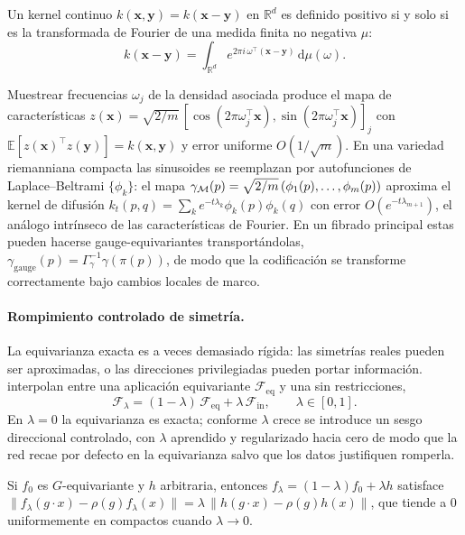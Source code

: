 \begin{theorem}[Bochner]
\label{thm:gauge:bochner}
Un kernel continuo $k(\mathbf{x}, \mathbf{y}) = k(\mathbf{x} - \mathbf{y})$ en
$\mathbb{R}^d$ es definido positivo si y solo si es la transformada de Fourier de
una medida finita no negativa $\mu$:
\[
  k(\mathbf{x} - \mathbf{y}) = \int_{\mathbb{R}^d} e^{2\pi i\,
  \omega^{\!\top}(\mathbf{x} - \mathbf{y})}\, \mathrm{d}\mu(\omega).
\]
\end{theorem}

Muestrear frecuencias $\omega_j$ de la densidad asociada produce el mapa de
caracter\'isticas $z(\mathbf{x}) = \sqrt{2/m}\,[\cos(2\pi\omega_j^{\!\top}\mathbf{x}),
\sin(2\pi\omega_j^{\!\top}\mathbf{x})]_j$ con $\mathbb{E}[z(\mathbf{x})^{\!\top}
z(\mathbf{y})] = k(\mathbf{x}, \mathbf{y})$ y error uniforme $O(1/\sqrt{m})$. En
una variedad riemanniana compacta las sinusoides se reemplazan por
autofunciones de Laplace--Beltrami $\{\phi_k\}$: el mapa $\gamma_{\mathcal{M}}(p) =
\sqrt{2/m}\,(\phi_1(p), \ldots, \phi_m(p))$ aproxima el kernel de difusi\'on
$k_t(p, q) = \sum_k e^{-t\lambda_k}\phi_k(p)\phi_k(q)$ con error
$O(e^{-t\lambda_{m+1}})$, el an\'alogo intr\'inseco de las caracter\'isticas de
Fourier. En un fibrado principal estas pueden hacerse gauge-equivariantes
transport\'andolas, $\gamma_{\text{gauge}}(p) =
\Gamma_\gamma^{-1}\gamma(\pi(p))$, de modo que la codificaci\'on se transforme
correctamente bajo cambios locales de marco.

\paragraph{Rompimiento controlado de simetr\'ia.}
La equivarianza exacta es a veces demasiado r\'igida: las simetr\'ias reales
pueden ser aproximadas, o las direcciones privilegiadas pueden portar
informaci\'on. \citet{vanderouderaa2024symmetry} interpolan entre una aplicaci\'on
equivariante $\mathcal{F}_{\text{eq}}$ y una sin restricciones,
\[
  \mathcal{F}_\lambda = (1 - \lambda)\,\mathcal{F}_{\text{eq}} + \lambda\,
  \mathcal{F}_{\text{in}},
  \qquad \lambda \in [0, 1].
\]
En $\lambda = 0$ la equivarianza es exacta; conforme $\lambda$ crece se introduce
un sesgo direccional controlado, con $\lambda$ aprendido y regularizado hacia cero
de modo que la red recae por defecto en la equivarianza salvo que los datos
justifiquen romperla.

\begin{proposition}
\label{prop:gauge:symmetry-breaking}
Si $f_0$ es $G$-equivariante y $h$ arbitraria, entonces $f_\lambda = (1 - \lambda)
f_0 + \lambda h$ satisface $\|f_\lambda(g\cdot x) - \rho(g) f_\lambda(x)\| =
\lambda\,\|h(g\cdot x) - \rho(g) h(x)\|$, que tiende a $0$ uniformemente en
compactos cuando $\lambda \to 0$.
\end{proposition}

